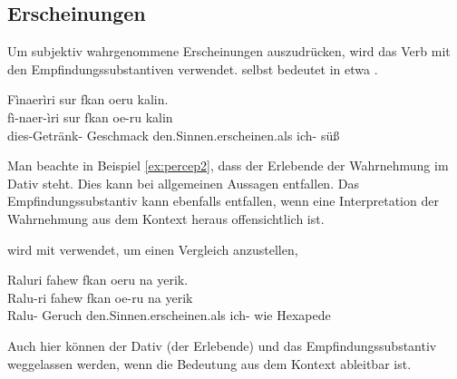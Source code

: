 \subsection{Erscheinungen}   
Um subjektiv wahrgenommene Erscheinungen auszudrücken, wird das Verb  mit den Empfindungssubstantiven verwendet.  selbst bedeutet in etwa .

\begin{interlin} \label{ex:percep2}
\glll Fìnaerìri sur fkan oeru kalin. \\
    fì-naer-ìri sur fkan oe-ru kalin \\
  	dies-Getränk- Geschmack den.Sinnen.erscheinen.als ich- süß \\
 \Ipawl{}
\end{interlin}

\noindent Man beachte in Beispiel \ref{ex:percep2}, dass der Erlebende der Wahrnehmung im Dativ steht. Dies kann bei allgemeinen Aussagen entfallen. Das Empfindungssubstantiv kann ebenfalls entfallen, wenn eine Interpretation der Wahrnehmung aus dem Kontext heraus offensichtlich ist.

 wird mit   verwendet, um einen Vergleich anzustellen,

\begin{interlin}
\glll Raluri fahew fkan oeru na yerik. \\
    Ralu-ri fahew fkan oe-ru na yerik \\
    Ralu- Geruch den.Sinnen.erscheinen.als ich- wie Hexapede \\
 \Ipawl{}
\end{interlin}

\noindent Auch hier können der Dativ (der Erlebende) und das Empfindungssubstantiv weggelassen werden, wenn die Bedeutung aus dem Kontext ableitbar ist.
